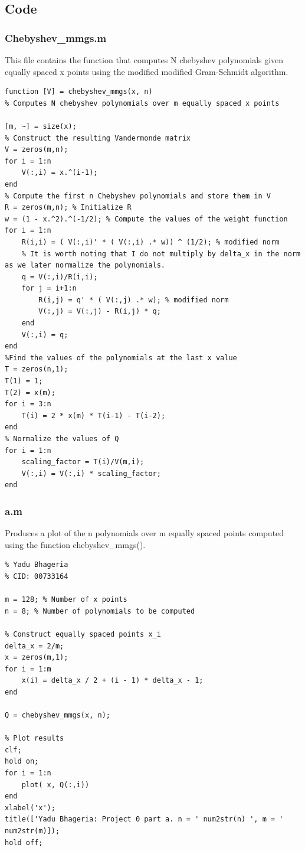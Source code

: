 \documentclass[a4paper,10pt]{article}
\begin{document}
\subsection{Code}
\subsubsection{Chebyshev\_mmgs.m}

This file contains the function that computes N chebyshev polynomials given equally spaced x points using the modified modified Gram-Schmidt algorithm.

\begin{lstlisting}
function [V] = chebyshev_mmgs(x, n)
% Computes N chebyshev polynomials over m equally spaced x points

[m, ~] = size(x);
% Construct the resulting Vandermonde matrix
V = zeros(m,n); 
for i = 1:n
    V(:,i) = x.^(i-1);
end
% Compute the first n Chebyshev polynomials and store them in V
R = zeros(m,n); % Initialize R
w = (1 - x.^2).^(-1/2); % Compute the values of the weight function
for i = 1:n
    R(i,i) = ( V(:,i)' * ( V(:,i) .* w)) ^ (1/2); % modified norm 
    % It is worth noting that I do not multiply by delta_x in the norm as we later normalize the polynomials.
    q = V(:,i)/R(i,i);
    for j = i+1:n
        R(i,j) = q' * ( V(:,j) .* w); % modified norm
        V(:,j) = V(:,j) - R(i,j) * q;
    end
    V(:,i) = q;
end
%Find the values of the polynomials at the last x value
T = zeros(n,1); 
T(1) = 1;
T(2) = x(m);
for i = 3:n
    T(i) = 2 * x(m) * T(i-1) - T(i-2);
end
% Normalize the values of Q
for i = 1:n
    scaling_factor = T(i)/V(m,i);
    V(:,i) = V(:,i) * scaling_factor;
end
\end{lstlisting}
\subsubsection{a.m}

Produces a plot of the n polynomials over m equally spaced points computed using the function chebyshev\_mmgs().

\begin{lstlisting}
% Yadu Bhageria
% CID: 00733164

m = 128; % Number of x points
n = 8; % Number of polynomials to be computed

% Construct equally spaced points x_i
delta_x = 2/m;
x = zeros(m,1);
for i = 1:m
    x(i) = delta_x / 2 + (i - 1) * delta_x - 1;
end

Q = chebyshev_mmgs(x, n);

% Plot results
clf;
hold on;
for i = 1:n
    plot( x, Q(:,i))
end
xlabel('x');
title(['Yadu Bhageria: Project 0 part a. n = ' num2str(n) ', m = ' num2str(m)]);
hold off;
\end{lstlisting}
\end{document}
